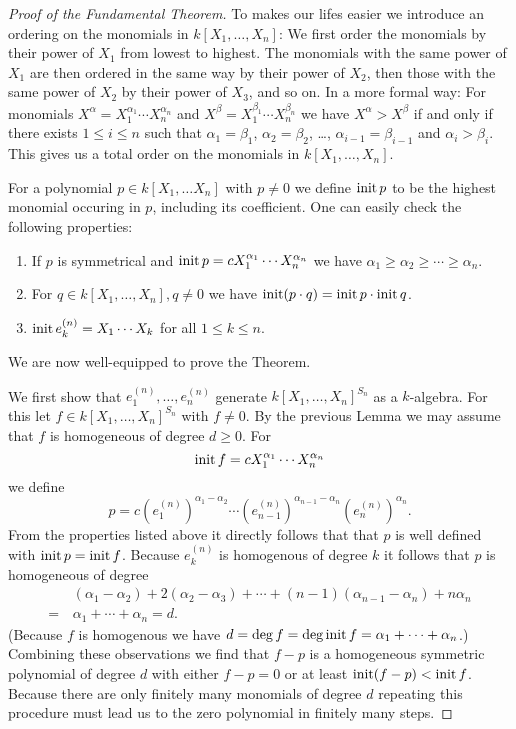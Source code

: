 \begin{proof}[Proof of the Fundamental Theorem]
To makes our lifes easier we introduce an ordering on the monomials in $k[X_1, \dotsc, X_n]$: We first order the monomials by their power of $X_1$ from lowest to highest. The monomials with the same power of $X_1$ are then ordered in the same way by their power of $X_2$, then those with the same power of $X_2$ by their power of $X_3$, and so on. In a more formal way: For monomials $X^\alpha = X_1^{\alpha_1} \dotsm X_n^{\alpha_n}$ and $X^\beta = X_1^{\beta_1} \dotsm X_n^{\beta_n}$ we have $X^\alpha > X^\beta$ if and only if there exists $1 \leq i \leq n$ such that $\alpha_1 = \beta_1$, $\alpha_2 = \beta_2$, \dots, $\alpha_{i-1} = \beta_{i-1}$ and $\alpha_i > \beta_i$. This gives us a total order on the monomials in $k[X_1, \dotsc, X_n]$.
 
 For a polynomial $p \in k[X_1, \dotsc X_n]$ with $p \neq 0$ we define $\operatorname{init} p$ to be the highest monomial occuring in $p$, including its coefficient. One can easily check the following properties:
 \begin{enumerate}
  \item
   If $p$ is symmetrical and $\operatorname{init} p = c X_1^{\alpha_1} \dotsm X_n^{\alpha_n}$ we have $\alpha_1 \geq \alpha_2 \geq \dotsb \geq \alpha_n$.
  \item
   For $q \in k[X_1, \dotsc, X_n], q \neq 0$ we have $\operatorname{init} (p \cdot q) = \operatorname{init} p \cdot \operatorname{init} q$.
  \item
   $\operatorname{init} e^{(n)}_k = X_1 \dotsm X_k$ for all $1 \leq k \leq n$.
 \end{enumerate}
 We are now well-equipped to prove the Theorem. 
 
 We first show that $e^{(n)}_1, \dotsc, e^{(n)}_n$ generate $k[X_1, \dotsc, X_n]^{S_n}$ as a $k$-algebra. For this let $f \in k[X_1, \dotsc, X_n]^{S_n}$ with $f \neq 0$. By the previous Lemma we may assume that $f$ is homogeneous of degree $d \geq 0$. For
 \[
  \operatorname{init} f = c X_1^{\alpha_1} \dotsm X_n^{\alpha_n}
 \]
 we define
 \[
  p = c \left(e^{(n)}_1\right)^{\alpha_1 - \alpha_2} \dotsm \left(e^{(n)}_{n-1}\right)^{\alpha_{n-1} - \alpha_n} \left(e^{(n)}_n\right)^{\alpha_n}.
 \]
 From the properties listed above it directly follows that that $p$ is well defined with $\operatorname{init} p = \operatorname{init} f$. Because $e^{(n)}_k$ is homogenous of degree $k$ it follows that $p$ is homogeneous of degree
 \begin{align*}
   &\,(\alpha_1-\alpha_2) + 2(\alpha_2-\alpha_3) + \dotsb + (n-1)(\alpha_{n-1}-\alpha_n)+n\alpha_n \\
  =&\, \alpha_1 + \dotsb + \alpha_n
  = d.
 \end{align*}
 (Because $f$ is homogenous we have $d = \deg f = \deg \operatorname{init} f = \alpha_1 + \dotsb + \alpha_n$.) Combining these observations we find that $f-p$ is a homogeneous symmetric polynomial of degree $d$ with either $f-p = 0$ or at least $\operatorname{init} (f-p) < \operatorname{init} f$. Because there are only finitely many monomials of degree $d$ repeating this procedure must lead us to the zero polynomial in finitely many steps.
 

\end{proof}
